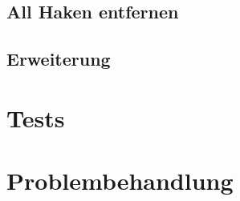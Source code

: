
\subsection{All Haken entfernen}\label{subsec:Haken}

\subsection{Erweiterung}\label{subsec:erweiterung}

\section{Tests}\label{sec:tests}

\section{Problembehandlung}\label{sec:problem}